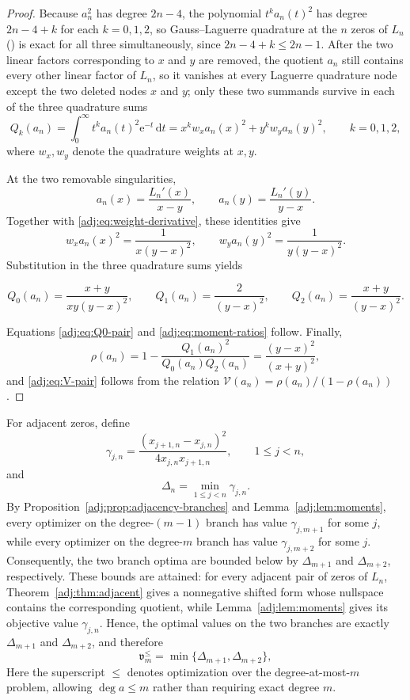 \documentclass[11pt]{article}
\numberwithin{equation}{section}
\theoremstyle{definition}
\theoremstyle{remark}
\newcommand{\Vcal}{\mathcal V}
\newcommand{\Lag}{L}
\newcommand{\dd}{\,\mathrm d}
\newcommand{\e}{\mathrm e}
\begin{document}
\begin{proof}
Because $a_n^2$ has degree $2n-4$, the polynomial $t^ka_n(t)^2$ has degree $2n-4+k$ for each $k=0,1,2$, so Gauss--Laguerre quadrature at the $n$ zeros of $\Lag_n$ () is exact for all three simultaneously, since $2n-4+k\le 2n-1$. After the two linear factors corresponding to $x$ and $y$ are removed, the quotient $a_n$ still contains every other linear factor of $\Lag_n$, so it vanishes at every Laguerre quadrature node except the two deleted nodes $x$ and $y$; only these two summands survive in each of the three quadrature sums
\[
 Q_k(a_n)=\int_0^\infty t^ka_n(t)^2\e^{-t}\dd t
 =x^kw_xa_n(x)^2+y^kw_ya_n(y)^2,
 \qquad k=0,1,2,
\]
where $w_x,w_y$ denote the quadrature weights at $x,y$.

At the two removable singularities,
\[
 a_n(x)=\frac{\Lag_n'(x)}{x-y},
 \qquad
 a_n(y)=\frac{\Lag_n'(y)}{y-x}.
\]
Together with \eqref{adj:eq:weight-derivative}, these identities give
\[
 w_xa_n(x)^2=\frac{1}{x(y-x)^2},
 \qquad
 w_ya_n(y)^2=\frac{1}{y(y-x)^2}.
\]
Substitution in the three quadrature sums yields

$$
Q_0(a_n) = \frac{x+y}{xy(y-x)^2}, \qquad Q_1(a_n) = \frac{2}{(y-x)^2}, \qquad Q_2(a_n) = \frac{x+y}{(y-x)^2}.
$$

Equations \eqref{adj:eq:Q0-pair} and \eqref{adj:eq:moment-ratios} follow. Finally,
\[
 \rho(a_n)=1-\frac{Q_1(a_n)^2}{Q_0(a_n)Q_2(a_n)}
 =\frac{(y-x)^2}{(x+y)^2},
\]
and \eqref{adj:eq:V-pair} follows from the relation $\Vcal(a_n)=\rho(a_n)/(1-\rho(a_n))$.
\end{proof}




For adjacent zeros, define
\begin{equation}\label{adj:eq:delta}
 {\gamma_{j,n}}
 =\frac{(x_{j+1,n}-x_{j,n})^2}
 {4x_{j,n}x_{j+1,n}},
 \qquad 1\leq j<n,
\end{equation}
and
$$
\Delta_n=\min_{1\le j<n}{\gamma_{j,n}}.
$$
By Proposition~\ref{adj:prop:adjacency-branches} and Lemma~\ref{adj:lem:moments}, every optimizer on the degree-$(m-1)$ branch has value ${\gamma_{j,m+1}}$ for some $j$, while every optimizer on the degree-$m$ branch has value ${\gamma_{j,m+2}}$ for some $j$. Consequently, the two branch optima are bounded below by $\Delta_{m+1}$ and $\Delta_{m+2}$, respectively. These bounds are attained: for every adjacent pair of zeros of $\Lag_n$, Theorem~\ref{adj:thm:adjacent} gives a nonnegative shifted form whose nullspace contains the corresponding quotient, while Lemma~\ref{adj:lem:moments} gives its objective value ${\gamma_{j,n}}$. Hence, the optimal values on the two branches are exactly $\Delta_{m+1}$ and $\Delta_{m+2}$, and therefore
\begin{equation}\label{adj:eq:closed-value}
 \mathfrak v_m^{\le}=\min\{\Delta_{m+1},\Delta_{m+2}\}{,}
\end{equation}
Here the superscript $\le$ denotes optimization over the degree-at-most-$m$ problem, allowing $\deg a\le m$ rather than requiring exact degree $m$.
\end{document}
